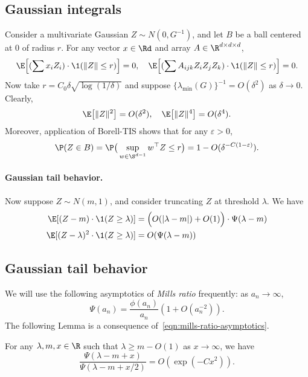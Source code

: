 \documentclass{article}
\begin{document}
	\subsection{Gaussian integrals}
	\label{subsec:gaussian-integrals}
	Consider a multivariate Gaussian $Z \sim N(0,G^{-1})$, and let $B$ be a ball centered at $0$ of radius $r$. For any vector $x \in \Rd$ and array $A \in \R^{d \times d \times d}$,
	\begin{equation}
	\label{eqn:gaussian-integrals-truncated-moments}
		\E\Big[(\sum x_i Z_i) \cdot \1(\|Z\| \leq r)\Big] = 0, \quad \E\Big[(\sum A_{ijk} Z_i Z_jZ_k) \cdot \1(\|Z\| \leq r)\Big] = 0.
	\end{equation}
	Now take $r = C_0 \delta \sqrt{\log(1/\delta)}$ and suppose $\{\lambda_{\min}(G)\}^{-1} = O(\delta^2)$ as $\delta \to 0$. Clearly,
	\begin{equation}
		\label{eqn:gaussian-integrals-moments}
		\E\big[\|Z\|^2\big] = O(\delta^2), \quad \E\big[\|Z\|^4\big] = O(\delta^4).
	\end{equation} 
	Moreover, application of Borell-TIS shows that for any $\varepsilon > 0$,
	\begin{equation}
	\label{eqn:gaussian-integrals-concentration}
		\P(Z \in B) = \P\big(\sup_{w \in \S^{d - 1}} w^{\top} Z \leq r\big) = 1 - O(\delta^{-C(1 - \varepsilon)}).
	\end{equation}

	\paragraph{Gaussian tail behavior.}
	Now suppose $Z \sim N(m,1)$, and consider truncating $Z$ at threshold $\lambda$. We have
	\begin{equation}
	\begin{aligned}
		\label{eqn:gaussian-integrals-tail-behavior}
		\E[(Z - m) \cdot \1(Z \geq \lambda)] 
		& = \Big(O(|\lambda - m|) + O(1)\Big) \cdot \Psi(\lambda - m) \\
		\E[(Z - \lambda)^2 \cdot \1(Z \geq \lambda)]
		& = O(\Psi(\lambda - m))
	\end{aligned}
	\end{equation}
	
	\subsection{Gaussian tail behavior}
	We will use the following asymptotics of \emph{Mills ratio} frequently: as $a_n \to \infty$,
	\begin{equation}
		\label{eqn:mills-ratio-asymptotics}
		\Psi(a_n) = \frac{\phi(a_n)}{a_n}(1 + O(a_n^{-2})).
	\end{equation}
	The following Lemma is a consequence of~\eqref{eqn:mills-ratio-asymptotics}.
	\begin{lemma}
	\label{lem:ratio-gaussian-survival-functions}
		For any $\lambda,m,x \in \R$ such that $\lambda \geq m - O(1)$ as $x \to \infty$, we have
		\begin{equation}
		\label{eqn:ratio-gaussian-survival-functions}
			\frac{\Psi(\lambda - m + x)}{\Psi(\lambda - m + x/2)} = O(\exp(-Cx^2)).
		\end{equation}
	\end{lemma}
	
\end{document}
